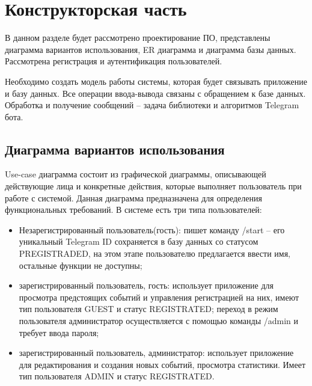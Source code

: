 \documentclass[12pt,a4paper,oneside]{report}
\begin{document}
\chapter{Конструкторская часть}
\qquad В данном разделе будет рассмотрено проектирование ПО, представлены диаграмма вариантов использования, ER диаграмма и диаграмма базы данных. Рассмотрена регистрация и аутентификация пользователей. 

Необходимо создать модель работы системы, которая будет связывать приложение и базу данных. Все операции ввода-вывода связаны с обращением к базе данных. Обработка и получение сообщений – задача библиотеки и алгоритмов Telegram бота.
\section{Диаграмма вариантов использования}
\quad Use-case диаграмма состоит из графической диаграммы, описывающей действующие лица и конкретные действия, которые выполняет пользователь при работе с системой.
Данная диаграмма предназначена для определения функциональных требований. В системе есть три типа пользователей:
\begin{itemize}
    \item Незарегистрированный пользователь(гость): пишет команду /start – его уникальный Telegram ID сохраняется в базу данных со статусом PREGISTRADED, на этом этапе пользователю предлагается ввести имя, остальные функции не доступны; 
    \item зарегистрированный пользователь, гость: использует приложение для просмотра предстоящих событий и управления регистрацией на них, имеют тип пользователя GUEST и статус REGISTRATED; переход в режим пользователя администратор осуществляется с помощью команды /admin и требует ввода пароля;
    \item зарегистрированный пользователь, администратор: использует приложение для редактирования и создания новых событий, просмотра статистики. Имеет тип пользователя ADMIN и статус REGISTRATED. 
\end{itemize}
\end{document}
